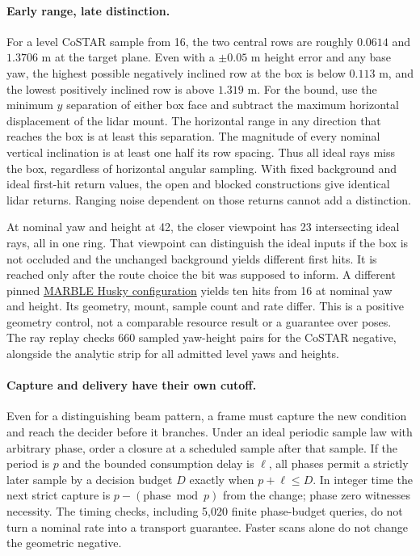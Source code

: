 \documentclass[11pt]{article}
\begin{document}
\paragraph{Early range, late distinction.}
For a level CoSTAR sample from 16, the two central rows are
roughly $0.0614$ and $1.3706$ m at the target plane.
Even with a $\pm0.05$ m height error and any base yaw, the highest
possible negatively inclined row at the box is below $0.113$ m,
and the lowest positively inclined row is above $1.319$ m.
For the bound, use the minimum $y$ separation of either box face
and subtract the maximum horizontal displacement of the lidar mount.
The horizontal range in any direction that reaches the box is at
least this separation. The magnitude of every nominal vertical
inclination is at least one half its row spacing. Thus all ideal
rays miss the box, regardless of horizontal angular sampling.
With fixed background and ideal first-hit return values, the
open and blocked constructions give identical lidar returns.
Ranging noise dependent on those returns cannot add a distinction.

At nominal yaw and height at 42, the closer viewpoint has 23
intersecting ideal rays, all in one ring. That viewpoint can
distinguish the ideal inputs if the box is not occluded and the
unchanged background yields different first hits. It is reached
only after the route choice the bit was supposed to inform.
A different pinned \href{https://github.com/osrf/subt/blob/083c6a8acb0c25aa1a35e34517e628cd3b52ae77/submitted_models/marble_husky_sensor_config_1/model.sdf}
{MARBLE Husky configuration} yields ten hits from 16 at nominal
yaw and height. Its geometry, mount, sample count and rate
differ. This is a positive geometry control, not a comparable
resource result or a guarantee over poses. The ray replay checks
660 sampled yaw-height pairs for the CoSTAR negative, alongside
the analytic strip for all admitted level yaws and heights.

\paragraph{Capture and delivery have their own cutoff.}
Even for a distinguishing beam pattern, a frame must capture
the new condition and reach the decider before it branches.
Under an ideal periodic sample law with arbitrary phase, order a
closure at a scheduled sample after that sample. If the period is
$p$ and the bounded consumption delay is $\ell$, all phases
permit a strictly later sample by a decision budget $D$ exactly
when $p+\ell\le D$. In integer time the next strict capture is
$p-(\text{phase}\bmod p)$ from the change; phase zero witnesses
necessity. The timing checks, including 5,020 finite phase-budget
queries, do not turn a nominal rate into a transport guarantee.
Faster scans alone do not change the geometric negative.
\end{document}
